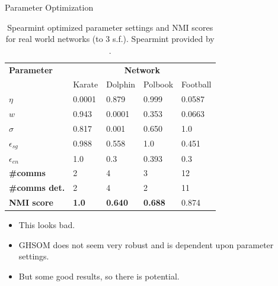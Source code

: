 \documentclass{beamer}
\begin{document}
	\begin{frame}[allowframebreaks]{Parameter Optimization}

\begin{table}
\centering
\begin{tabular}{l l l l l}
\bottomrule
\textbf{Parameter} & \multicolumn{4}{c}{\textbf{Network}} \\
{} & Karate & Dolphin & Polbook & Football \\
\bottomrule
$\eta$ & 0.0001 & 0.879 & 0.999 & 0.0587 \\
$w$ & 0.943 & 0.0001 & 0.353 & 0.0663 \\
$\sigma$ & 0.817 & 0.001 & 0.650 & 1.0 \\
$\epsilon_{sg}$ & 0.988 & 0.558 & 1.0 &  0.451 \\
$\epsilon_{en}$ & 1.0 & 0.3 & 0.393 & 0.3 \\
\bottomrule
\textbf{\#comms} & 2 & 4 & 3 & 12 \\
\textbf{\#comms det.} & 2 & 4 & 2 & 11 \\
\textbf{NMI score} & \textbf{1.0} & \textbf{0.640} & \textbf{0.688} & 0.874 \\
\bottomrule
\end{tabular}
\caption{Spearmint optimized parameter settings and NMI scores for real world networks (to 3 s.f.). Spearmint provided by \protect\cite{snoek2012practical}.}
\label{bayes}
\end{table}	
	
	\begin{itemize}
	\item This looks bad.
	\item GHSOM does not seem very robust and is dependent upon parameter settings. 
	\item But some good results, so there is potential.
	\end{itemize}
	
	\end{frame}
	
\end{document}
